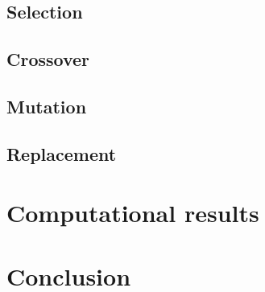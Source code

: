 \documentclass[onecolumn]{IEEEtran}
\begin{document}
\subsection{Selection}

\subsection{Crossover}

\subsection{Mutation}

\subsection{Replacement}

\section{Computational results}

\section{Conclusion}



\end{document}
